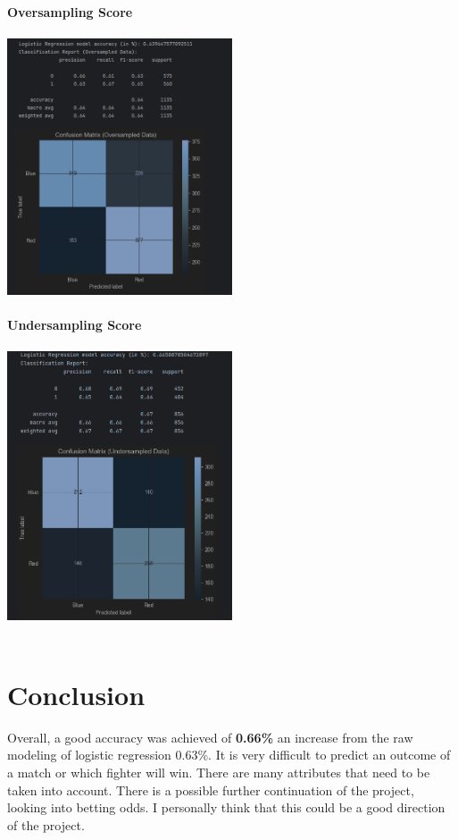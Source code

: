 \documentclass{article}
\begin{document}
	{\large \textbf{Oversampling Score}}\\\\
	\includegraphics[width=0.5\textwidth]{images/Oversamping_score.png}\\\\
\newpage
	{\large \textbf{Undersampling Score}}\\\\
	\includegraphics[width=0.5\textwidth]{images/Undersampling_score.png}\\\\
\section{Conclusion}
Overall, a good accuracy was achieved of \textbf{0.66\%} an increase from the raw modeling of logistic regression 0.63\%. It is very difficult to predict an outcome of a match or which fighter will win. There are many attributes that need to be taken into account. There is a possible further continuation of the project, looking into betting odds. I personally think that this could be a good direction of the project.\\
\end{document}
